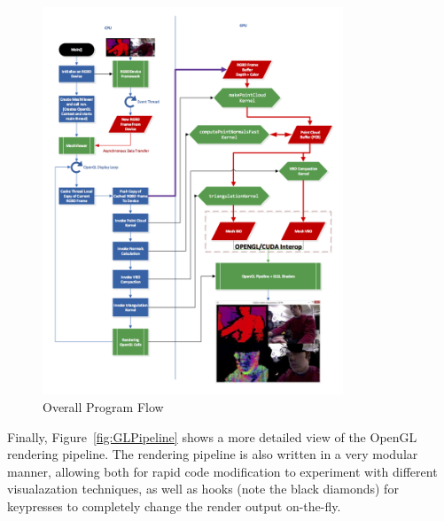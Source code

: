 \documentclass{jcgt}
\begin{document}
\begin{figure}[htb]
  \centering
   \includegraphics[width=0.8\textwidth]{../../diagrams/ProgramFlow.png}
   \caption{\label{fig:progFlow}
        Overall Program Flow}
\end{figure}

Finally, Figure~\ref{fig:GLPipeline} shows a more detailed view of the OpenGL rendering pipeline. The rendering pipeline is also written in a very modular manner, allowing both for rapid code modification to experiment with different visualazation techniques, as well as hooks (note the black diamonds) for keypresses to completely change the render output on-the-fly.
\end{document}
